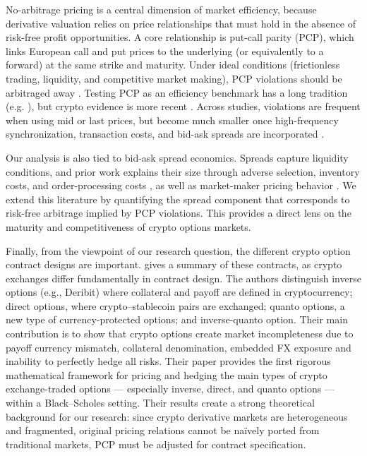 \documentclass[12pt]{article}
\begin{document}
No-arbitrage pricing is a central dimension of market efficiency, because derivative valuation relies on price relationships that must hold in the absence of risk-free profit opportunities. A core relationship is put-call parity (PCP), which links European call and put prices to the underlying (or equivalently to a forward) at the same strike and maturity. Under ideal conditions (frictionless trading, liquidity, and competitive market making), PCP violations should be arbitraged away \citep{klemkosky1979put}. Testing PCP as an efficiency benchmark has a long tradition (e.g. \citep{klemkosky1979put, kamara1995daily, el1998put, cremers2010deviations}), but crypto evidence is more recent \citep{alexander2023arbitrage, zhou2023checking, felfoldi2024put, johnson2022arbitrage}. Across studies, violations are frequent when using mid or last prices, but become much smaller once high-frequency synchronization, transaction costs, and bid-ask spreads are incorporated \citep{wagner1996factors, el1998put, nisbet1992put, felfoldi2024put}.

Our analysis is also tied to bid-ask spread economics. Spreads capture liquidity conditions, and prior work explains their size through adverse selection, inventory costs, and order-processing costs \citep{foucault2013market}, as well as market-maker pricing behavior \citep{glosten1985bid, brunnermeier2009market, ding1999determinants}. We extend this literature by quantifying the spread component that corresponds to risk-free arbitrage implied by PCP violations. This provides a direct lens on the maturity and competitiveness of crypto options markets.

Finally, from the viewpoint of our research question, the different crypto option contract designs are important. \cite{alexander2023crypto} gives a summary of these contracts, as crypto exchanges differ fundamentally in contract design. The authors distinguish inverse options (e.g., Deribit) where collateral and payoff are defined in cryptocurrency; direct options, where crypto–stablecoin pairs are exchanged; quanto options, a new type of currency-protected options; and inverse-quanto option. Their main contribution is to show that crypto options create market incompleteness due to payoff currency mismatch, collateral denomination, embedded FX exposure and inability to perfectly hedge all risks. Their paper provides the first rigorous mathematical framework for pricing and hedging the main types of crypto exchange-traded options — especially inverse, direct, and quanto options — within a Black–Scholes setting. Their results create a strong theoretical background for our research: since crypto derivative markets are heterogeneous and fragmented, original pricing relations cannot be naïvely ported from traditional markets, PCP must be adjusted for contract specification.
\end{document}
